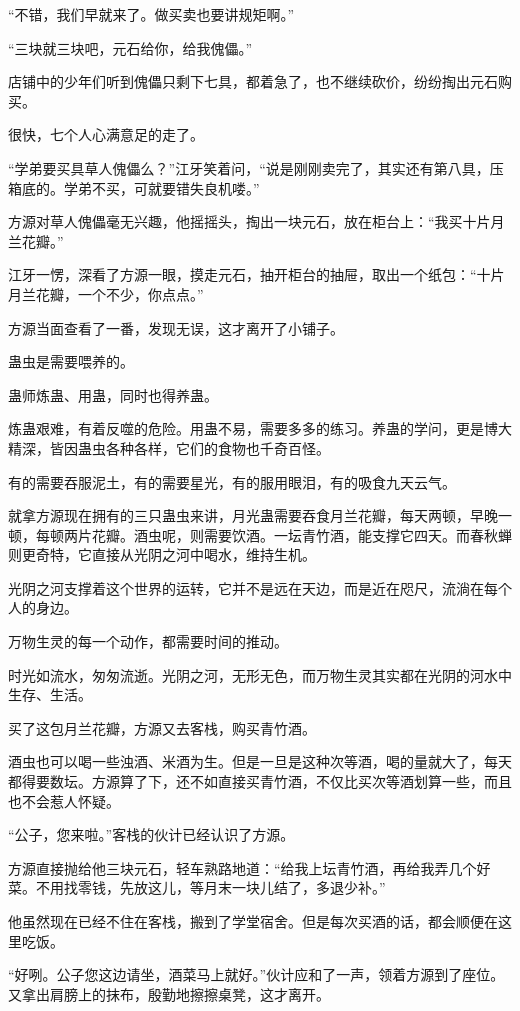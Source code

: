 \begin{this_body}
“不错，我们早就来了。做买卖也要讲规矩啊。”

“三块就三块吧，元石给你，给我傀儡。”

店铺中的少年们听到傀儡只剩下七具，都着急了，也不继续砍价，纷纷掏出元石购买。

很快，七个人心满意足的走了。

“学弟要买具草人傀儡么？”江牙笑着问，“说是刚刚卖完了，其实还有第八具，压箱底的。学弟不买，可就要错失良机喽。”

方源对草人傀儡毫无兴趣，他摇摇头，掏出一块元石，放在柜台上：“我买十片月兰花瓣。”

江牙一愣，深看了方源一眼，摸走元石，抽开柜台的抽屉，取出一个纸包：“十片月兰花瓣，一个不少，你点点。”

方源当面查看了一番，发现无误，这才离开了小铺子。

蛊虫是需要喂养的。

蛊师炼蛊、用蛊，同时也得养蛊。

炼蛊艰难，有着反噬的危险。用蛊不易，需要多多的练习。养蛊的学问，更是博大精深，皆因蛊虫各种各样，它们的食物也千奇百怪。

有的需要吞服泥土，有的需要星光，有的服用眼泪，有的吸食九天云气。

就拿方源现在拥有的三只蛊虫来讲，月光蛊需要吞食月兰花瓣，每天两顿，早晚一顿，每顿两片花瓣。酒虫呢，则需要饮酒。一坛青竹酒，能支撑它四天。而春秋蝉则更奇特，它直接从光阴之河中喝水，维持生机。

光阴之河支撑着这个世界的运转，它并不是远在天边，而是近在咫尺，流淌在每个人的身边。

万物生灵的每一个动作，都需要时间的推动。

时光如流水，匆匆流逝。光阴之河，无形无色，而万物生灵其实都在光阴的河水中生存、生活。

买了这包月兰花瓣，方源又去客栈，购买青竹酒。

酒虫也可以喝一些浊酒、米酒为生。但是一旦是这种次等酒，喝的量就大了，每天都得要数坛。方源算了下，还不如直接买青竹酒，不仅比买次等酒划算一些，而且也不会惹人怀疑。

“公子，您来啦。”客栈的伙计已经认识了方源。

方源直接抛给他三块元石，轻车熟路地道：“给我上坛青竹酒，再给我弄几个好菜。不用找零钱，先放这儿，等月末一块儿结了，多退少补。”

他虽然现在已经不住在客栈，搬到了学堂宿舍。但是每次买酒的话，都会顺便在这里吃饭。

“好咧。公子您这边请坐，酒菜马上就好。”伙计应和了一声，领着方源到了座位。又拿出肩膀上的抹布，殷勤地擦擦桌凳，这才离开。


\end{this_body}
